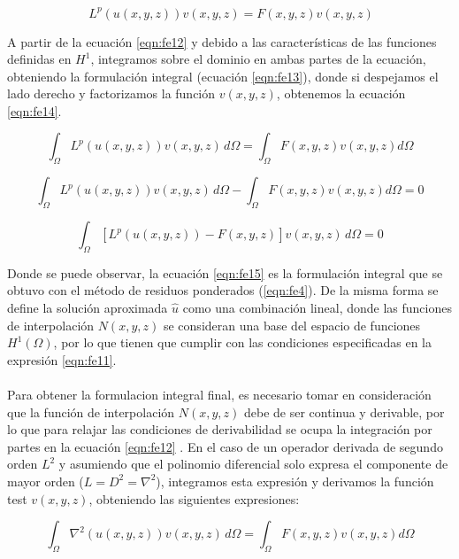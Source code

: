 \begin{equation}
\label{eqn:fe12}
  \ L^{p}(u(x,y,z))v(x,y,z)=F(x,y,z)v(x,y,z)
\end{equation}

A partir de la ecuación \ref{eqn:fe12} y debido a las características de las funciones definidas en $H^{1}$, integramos sobre el dominio en ambas partes de la ecuación, obteniendo la formulación integral (ecuación \ref{eqn:fe13}), donde si despejamos el lado derecho y factorizamos la función $v(x,y,z)$, obtenemos la ecuación \ref{eqn:fe14}.

\begin{equation}
\label{eqn:fe13}
  \displaystyle\int_{\Omega}^{} L^{p}(u(x,y,z))v(x,y,z)\, d\Omega = \displaystyle\int_{\Omega}^{} F(x,y,z)v(x,y,z)d\Omega  
\end{equation}

\begin{equation}
\label{eqn:fe14}
 \displaystyle\int_{\Omega}^{} L^{p}(u(x,y,z))v(x,y,z)\, d\Omega - \displaystyle\int_{\Omega}^{} F(x,y,z)v(x,y,z)d\Omega = 0  
\end{equation}

\begin{equation}
\label{eqn:fe15}
 \displaystyle\int_{\Omega}^{} [L^{p}(u(x,y,z))-F(x,y,z)]v(x,y,z)\, d\Omega = 0   
\end{equation}

Donde se puede observar, la ecuación \ref{eqn:fe15} es la formulación integral que se obtuvo con el método de residuos ponderados (\ref{eqn:fe4}). De la misma forma se define la solución aproximada $\hat{u}$ como una combinación lineal, donde las funciones de interpolación $N(x,y,z)$ se consideran una base del espacio de funciones $H^{1}(\Omega)$,  por lo que tienen que cumplir con las condiciones especificadas en la expresión \ref{eqn:fe11}.
\\
\\
Para obtener la formulacion integral final, es necesario tomar en consideración que la función de interpolación $N(x,y,z)$ debe de ser continua y derivable, por lo que para relajar las condiciones de derivabilidad se ocupa la integración por partes en la ecuación \ref{eqn:fe12} . En el caso de un operador derivada de segundo orden $L^{2}$ y asumiendo que el polinomio diferencial solo expresa el componente de mayor orden ($L=D^{2}={\nabla}^{2}$), integramos esta expresión y derivamos la función test $v(x,y,z)$, obteniendo las siguientes expresiones:

\begin{equation}
\label{eqn:fe16}
 \displaystyle\int_{\Omega}^{} {\nabla}^{2}(u(x,y,z))v(x,y,z)\, d\Omega = \displaystyle\int_{\Omega}^{} F(x,y,z)v(x,y,z)d\Omega  
\end{equation}


